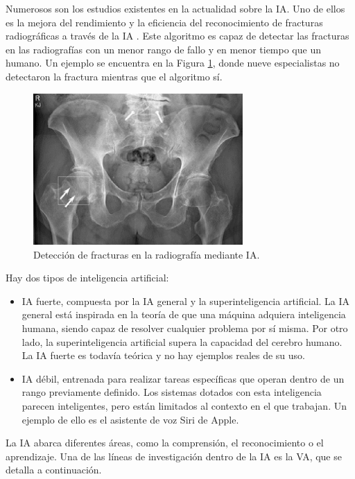 Numerosos son los estudios existentes en la actualidad sobre la IA. Uno de ellos es la mejora del rendimiento y la eficiencia  del reconocimiento de fracturas radiográficas a través de la IA \cite{guermazi21}. Este algoritmo es capaz de detectar las fracturas en las radiografías con un menor rango de fallo y en menor tiempo que un humano. Un ejemplo se encuentra en la Figura \ref{fig:rad1}, donde nueve especialistas no detectaron la fractura mientras que el algoritmo sí.\\
\begin{figure} [h!]
  \begin{center}
    \includegraphics[width=8cm]{figs/rad1}
  \end{center}
  \caption{Detección de fracturas en la radiografía mediante IA.}
  \label{fig:rad1}
\end{figure}

Hay dos tipos de inteligencia artificial:
\begin{itemize}
 \item IA fuerte, compuesta por la IA general y la superinteligencia artificial. La IA general está inspirada en la teoría de que una máquina adquiera inteligencia humana, siendo capaz de resolver cualquier problema por sí misma. Por otro lado, la superinteligencia artificial supera la capacidad del cerebro humano. La IA fuerte es todavía teórica y no hay ejemplos reales de su uso.
  \item IA débil, entrenada para realizar tareas específicas que operan dentro de un rango previamente definido. Los sistemas dotados con esta inteligencia parecen inteligentes, pero están limitados al contexto en el que trabajan. Un ejemplo de ello es el asistente de voz Siri de Apple.
\end{itemize}

La IA abarca diferentes áreas, como la comprensión, el reconocimiento o el aprendizaje. Una de las líneas de investigación dentro de la IA es la VA, que se detalla a continuación.\\

